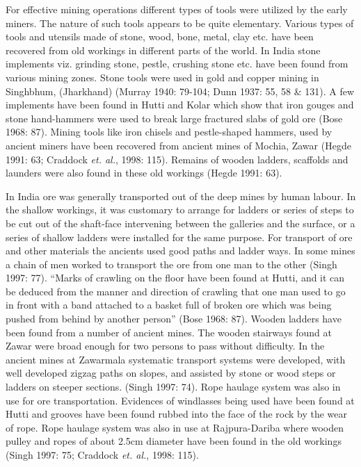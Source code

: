 For effective mining operations different types of tools were utilized by the early miners. The nature of such tools appears to be quite elementary.  Various types of tools and utensils made of stone, wood, bone, metal, clay etc. have been recovered from old workings in different parts of the world. In India stone implements viz. grinding stone, pestle, crushing stone etc. have been found from various mining zones. Stone tools were used in gold and copper mining in Singhbhum, (Jharkhand) (Murray 1940: 79-104; Dunn 1937: 55, 58 \& 131). A few implements have been found in Hutti and Kolar which show that iron gouges and stone hand-hammers were used to break large fractured slabs of gold ore (Bose 1968: 87). Mining tools like iron chisels and pestle-shaped hammers, used by ancient miners have been recovered from ancient mines of Mochia, Zawar (Hegde 1991: 63; Craddock {\it et. al.}, 1998: 115). Remains of wooden ladders, scaffolds and launders were also found in these old workings (Hegde 1991: 63).  



In India ore was generally transported out of the deep mines by human labour. In the shallow workings, it was customary to arrange for ladders or series of steps to be cut out of the shaft-face intervening between the galleries and the surface, or a series of shallow ladders were installed for the same purpose. For transport of ore and other materials the ancients used good paths and ladder ways. In some mines a chain of men worked to transport the ore from one man to the other (Singh 1997: 77). “Marks of crawling on the floor have been found at Hutti, and it can be deduced from the manner and direction of crawling that one man used to go in front with a band attached to a basket full of broken ore which was being pushed from behind by another person” (Bose 1968: 87). Wooden ladders have been found from a number of ancient mines. The wooden stairways found at Zawar were broad enough for two persons to pass without difficulty. In the ancient mines at Zawarmala systematic transport systems were developed, with well developed zigzag paths on slopes, and assisted by stone or wood steps or ladders on steeper sections. (Singh 1997: 74). Rope haulage system was also in use for ore transportation. Evidences of windlasses being used have been found at Hutti and grooves have been found rubbed into the face of the rock by the wear of rope. Rope haulage system was also in use at Rajpura-Dariba where wooden pulley and ropes of about 2.5cm diameter have been found in the old workings (Singh 1997: 75; Craddock {\it et. al.}, 1998: 115).

